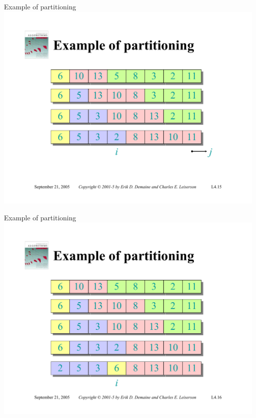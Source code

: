 \documentclass{beamer}
\begin{document}
\begin{frame}{Example of partitioning}
    \centering
    \includegraphics[width=\textwidth, trim={2.75cm 1.80cm 2.75cm 5.00cm}, clip]{pages/lec4_15}
\end{frame}
\begin{frame}{Example of partitioning}
    \centering
    \includegraphics[width=\textwidth, trim={2.75cm 1.80cm 2.75cm 5.00cm}, clip]{pages/lec4_16}
\end{frame}
\end{document}
